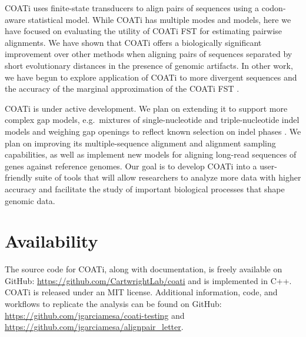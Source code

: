 \documentclass[12pt,letterpaper]{article}
\begin{document}

COATi uses finite-state transducers to align pairs of sequences using a codon-aware statistical model. While COATi has multiple modes and models, here we have focused on evaluating the utility of COATi FST for estimating pairwise alignments. We have shown that COATi offers a biologically significant improvement over other methods when aligning pairs of sequences separated by short evolutionary distances in the presence of genomic artifacts. In other work, we have begun to explore application of COATi to more divergent sequences and the accuracy of the marginal approximation of the COATi FST \citep{garcia2023dissertation}. 

COATi is under active development. We plan on extending it to support more complex gap models, e.g.\ mixtures of single-nucleotide and triple-nucleotide indel models and weighing gap openings to reflect known selection on indel phases \citep{zhu2022profiling}. We plan on improving its multiple-sequence alignment and alignment sampling capabilities, as well as implement new models for aligning long-read sequences of genes against reference genomes. Our goal is to develop COATi into a user-friendly suite of tools that will allow researchers to analyze more data with higher accuracy and facilitate the study of important biological processes that shape genomic data.

\section*{Availability}
The source code for COATi, along with documentation, is freely available on GitHub: \url{https://github.com/CartwrightLab/coati} and is implemented in C++. COATi is released under an MIT license. Additional information, code, and workflows to replicate the analysis can be found on GitHub: \url{https://github.com/jgarciamesa/coati-testing} and \url{https://github.com/jgarciamesa/alignpair_letter}.
\end{document}
